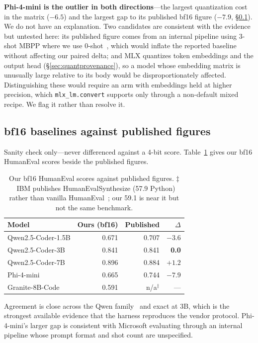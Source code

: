 \documentclass[11pt]{article}
\begin{document}
\textbf{Phi-4-mini is the outlier in both directions}---the largest quantization cost in
the matrix ($-6.5$) and the largest gap to its published bf16 figure ($-7.9$,
\S\ref{sec:baselines}). We do not have an explanation. Two candidates are consistent
with the evidence but untested here: its published figure comes from an internal
pipeline using 3-shot MBPP where we use 0-shot~\citep{microsoft2025phi4mini}, which would
inflate the reported baseline without affecting our paired delta; and MLX quantizes token
embeddings and the output head (\S\ref{sec:quantprovenance}), so a model whose embedding
matrix is unusually large relative to its body would be disproportionately affected.
Distinguishing these would require an arm with embeddings held at higher precision, which
\texttt{mlx\_lm.convert} supports only through a non-default mixed recipe. We flag it
rather than resolve it.

\subsection{bf16 baselines against published figures}
\label{sec:baselines}

Sanity check only---never differenced against a 4-bit score. Table~\ref{tab:baselines}
gives our bf16 HumanEval scores beside the published figures.

\begin{table}[h]
  \centering
  \caption{Our bf16 HumanEval scores against published figures.
    $\ddagger$~IBM publishes HumanEvalSynthesize (57.9 Python) rather than vanilla
    HumanEval~\citep{ibm2024granite}; our 59.1 is near it but not the same benchmark.}
  \label{tab:baselines}
  \smallskip
  \begin{tabular}{lrrr}
    \toprule
    Model & Ours (bf16) & Published & $\Delta$ \\
    \midrule
    Qwen2.5-Coder-1.5B & 0.671 & 0.707 & $-3.6$ \\
    Qwen2.5-Coder-3B   & 0.841 & 0.841 & \textbf{0.0} \\
    Qwen2.5-Coder-7B   & 0.896 & 0.884 & $+1.2$ \\
    Phi-4-mini         & 0.665 & 0.744 & $-7.9$ \\
    Granite-8B-Code    & 0.591 & n/a$^\ddagger$ & --- \\
    \bottomrule
  \end{tabular}
\end{table}

Agreement is close across the Qwen family~\citep{qwen2024coder} and exact at 3B, which is
the strongest available evidence that the harness reproduces the vendor protocol.
Phi-4-mini's larger gap is consistent with Microsoft evaluating through an internal
pipeline whose prompt format and shot count are unspecified.
\end{document}
